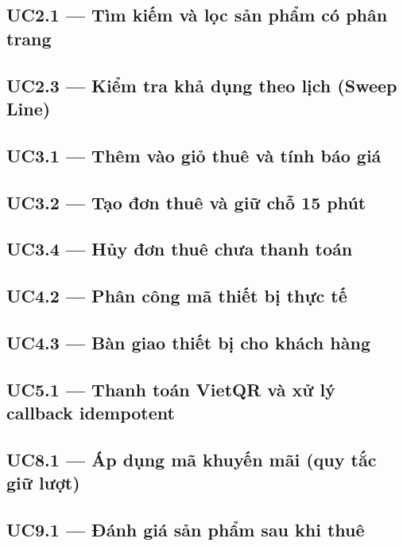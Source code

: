\subsection{UC2.1 --- Tìm kiếm và lọc sản phẩm có phân trang}

\subsection{UC2.3 --- Kiểm tra khả dụng theo lịch (Sweep Line)}

\subsection{UC3.1 --- Thêm vào giỏ thuê và tính báo giá}

\subsection{UC3.2 --- Tạo đơn thuê và giữ chỗ 15 phút}

\subsection{UC3.4 --- Hủy đơn thuê chưa thanh toán}

\subsection{UC4.2 --- Phân công mã thiết bị thực tế}

\subsection{UC4.3 --- Bàn giao thiết bị cho khách hàng}

\subsection{UC5.1 --- Thanh toán VietQR và xử lý callback idempotent}

\subsection{UC8.1 --- Áp dụng mã khuyến mãi (quy tắc giữ lượt)}

\subsection{UC9.1 --- Đánh giá sản phẩm sau khi thuê}
